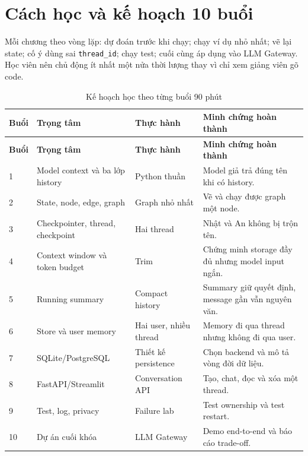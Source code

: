 \chapter*{Cách học và kế hoạch 10 buổi}

\begin{aicheckpoint}
Mỗi chương theo vòng lặp: dự đoán trước khi chạy; chạy ví dụ nhỏ nhất; vẽ lại state; cố ý dùng
sai \texttt{thread\_id}; chạy test; cuối cùng áp dụng vào LLM Gateway. Học viên nên chủ động
ít nhất một nửa thời lượng thay vì chỉ xem giảng viên gõ code.
\end{aicheckpoint}

\begin{longtable}{p{1.0cm}p{4.9cm}p{2.9cm}p{5.1cm}}
\caption{Kế hoạch học theo từng buổi 90 phút}\label{tab:course-plan}\\
\toprule
\textbf{Buổi} & \textbf{Trọng tâm} & \textbf{Thực hành} & \textbf{Minh chứng hoàn thành} \\
\midrule
\endfirsthead
\toprule
\textbf{Buổi} & \textbf{Trọng tâm} & \textbf{Thực hành} & \textbf{Minh chứng hoàn thành} \\
\midrule
\endhead
1 & Model context và ba lớp history & Python thuần & Model giả trả đúng tên khi có history. \\
2 & State, node, edge, graph & Graph nhỏ nhất & Vẽ và chạy được graph một node. \\
3 & Checkpointer, thread, checkpoint & Hai thread & Nhật và An không bị trộn tên. \\
4 & Context window và token budget & Trim & Chứng minh storage đầy đủ nhưng model input ngắn. \\
5 & Running summary & Compact history & Summary giữ quyết định, message gần vẫn nguyên văn. \\
6 & Store và user memory & Hai user, nhiều thread & Memory đi qua thread nhưng không đi qua user. \\
7 & SQLite/PostgreSQL & Thiết kế persistence & Chọn backend và mô tả vòng đời dữ liệu. \\
8 & FastAPI/Streamlit & Conversation API & Tạo, chat, đọc và xóa một thread. \\
9 & Test, log, privacy & Failure lab & Test ownership và test restart. \\
10 & Dự án cuối khóa & LLM Gateway & Demo end-to-end và báo cáo trade-off. \\
\bottomrule
\end{longtable}

